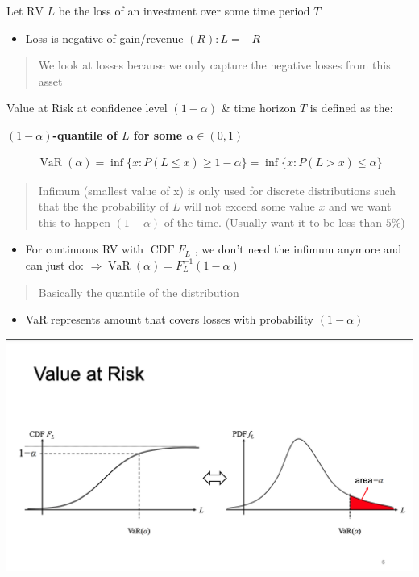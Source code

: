 \documentclass[
  oneside]{book}
\providecommand{\tightlist}{%
  \setlength{\itemsep}{0pt}\setlength{\parskip}{0pt}}
\begin{document}
Let \(\mathrm{RV}\) \(L\) be the loss of an investment over some time period \(T\)

\begin{itemize}
\tightlist
\item
  Loss is negative of gain/revenue \((R): L=-R\)
\end{itemize}

\begin{quote}
We look at losses because we only capture the negative losses from this asset
\end{quote}

Value at Risk at confidence level \((1-\alpha)\) \& time horizon \(T\) is defined as the:

\textbf{\((1-\alpha)\)-quantile of \(L\) for some \(\alpha \in(0,1)\)}

\[
\begin{aligned}
\operatorname{VaR}(\alpha)=\inf \{x: P(L \leq x) \geq 1-\alpha\}=\inf \{x: P(L>x) \leq \alpha\}
\end{aligned}
\]

\begin{quote}
Infimum (smallest value of x) is only used for discrete distributions such that the the probability of \(L\) will not exceed some value \(x\) and we want this to happen \((1-\alpha)\) of the time. (Usually want it to be less than \(5\%\))
\end{quote}

\begin{itemize}
\tightlist
\item
  For continuous RV with \(\operatorname{CDF} F_L\) , we don't need the infimum anymore and can just do: \(\Rightarrow \operatorname{VaR}(\alpha)=F_L^{-1}(1-\alpha)\)
\end{itemize}

\begin{quote}
Basically the quantile of the distribution
\end{quote}

\begin{itemize}
\tightlist
\item
  VaR represents amount that covers losses with probability \((1-\alpha)\)
\end{itemize}

\includegraphics{Notes/Obsidian-Attachments/7-Risk-Management-1.png}
\end{document}
